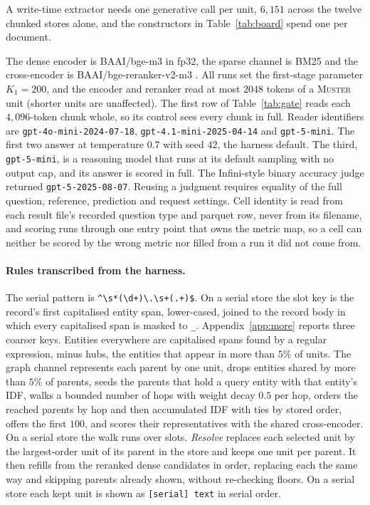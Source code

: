 \documentclass{article}
\newcommand{\sys}{\textsc{Muster}}
\begin{document}
A write-time extractor needs one generative call per unit, $6{,}151$ across the twelve chunked
stores alone, and the constructors in Table~\ref{tab:board} spend one per document.

The dense encoder is BAAI/bge-m3 \cite{bgem3} in fp32, the sparse channel is BM25 and
the cross-encoder is BAAI/bge-reranker-v2-m3 \cite{bgererank}. All runs set the first-stage parameter $K_1=200$, and the encoder and reranker
read at most $2048$ tokens of a \sys{} unit (shorter units are unaffected). The first row of Table~\ref{tab:gate} reads each $4{,}096$-token chunk whole, so its control sees every chunk in full. Reader identifiers are \texttt{gpt-4o-mini-2024-07-18},
\texttt{gpt-4.1-mini-2025-04-14} and \texttt{gpt-5-mini}. The first two answer at temperature $0.7$ with
seed $42$, the harness default. The third, \texttt{gpt-5-mini}, is a reasoning model that runs at its default sampling
with no output cap, and its answer is scored in full.
The Infini-style binary accuracy judge returned \texttt{gpt-5-2025-08-07}.
Reusing a judgment requires equality of the full question, reference, prediction and request settings.
Cell identity is read from each result file's recorded question type and parquet row, never from its
filename, and scoring runs through one entry point that owns the metric map, so a cell can neither be
scored by the wrong metric nor filled from a run it did not come from.

\paragraph{Rules transcribed from the harness.} The serial pattern is
\verb|^\s*(\d+)\.\s+(.+)$|. On a serial store the slot key is the record's first capitalised entity
span, lower-cased, joined to the record body in which every capitalised span is masked to \texttt{\_}.
Appendix~\ref{app:more} reports three coarser keys. Entities everywhere are capitalised spans found by a
regular expression, minus hubs, the entities that appear in more than $5\%$ of units. The graph channel
represents each parent by one unit, drops entities shared by more than $5\%$ of parents, seeds the parents that hold a query entity with that entity's IDF,
walks a bounded number of hops with weight decay $0.5$ per hop, orders the reached parents by hop and
then accumulated IDF with ties by stored order, offers the first $100$, and scores their representatives
with the shared cross-encoder. On a serial store the walk runs over slots. \emph{Resolve} replaces each selected unit by the largest-order unit of its parent in the store and keeps one unit per parent. It then refills from the reranked dense candidates in order, replacing each the same way and skipping parents already shown, without re-checking floors. On a serial store each kept unit is shown as \texttt{[serial] text} in serial order.
\end{document}
